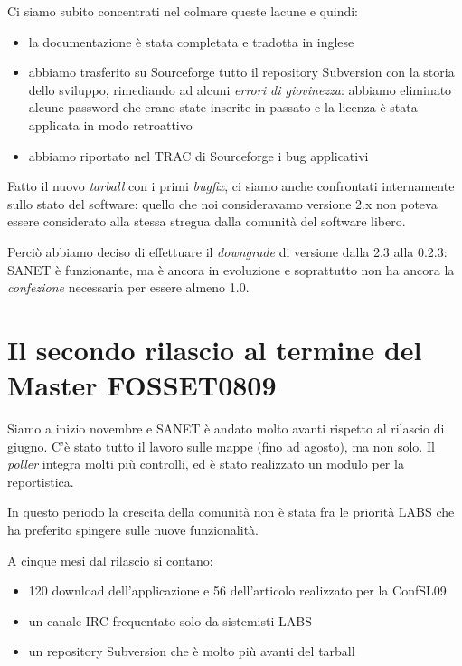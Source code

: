 \documentclass[a4wide,10pt,italian]{manual}
\begin{document}
Ci siamo subito concentrati nel colmare queste lacune e quindi:
\begin{itemize}
\item {} 
la documentazione è stata completata e tradotta in inglese

\item {} 
abbiamo trasferito su Sourceforge tutto il repository Subversion con la storia dello sviluppo,
rimediando ad alcuni \emph{errori di giovinezza}: abbiamo eliminato alcune password che erano state
inserite in passato e la licenza è stata applicata in modo retroattivo

\item {} 
abbiamo riportato nel TRAC di Sourceforge i bug applicativi

\end{itemize}

Fatto il nuovo \emph{tarball} con i primi \emph{bugfix}, ci siamo anche confrontati internamente
sullo stato del software: quello che noi consideravamo versione 2.x
non poteva essere considerato alla stessa stregua dalla comunità del software libero.

Perciò abbiamo deciso di effettuare il \emph{downgrade} di versione dalla 2.3 alla 0.2.3:
SANET è funzionante, ma è ancora in evoluzione e soprattutto non ha ancora la \emph{confezione}
necessaria per essere almeno 1.0.


\section{Il secondo rilascio al termine del Master FOSSET0809}

Siamo a inizio novembre e SANET è andato molto avanti rispetto al rilascio di giugno.
C'è stato tutto il lavoro sulle mappe (fino ad agosto), ma non solo. Il \emph{poller} integra molti più controlli,
ed è stato realizzato un modulo per la reportistica.

In questo periodo la crescita della comunità non è stata fra le priorità LABS
che ha preferito spingere sulle nuove funzionalità.

A cinque mesi dal rilascio si contano:
\begin{itemize}
\item {} 
120 download dell'applicazione e 56 dell'articolo realizzato per la ConfSL09

\item {} 
un canale IRC frequentato solo da sistemisti LABS

\item {} 
un repository Subversion che è molto più avanti del tarball

\end{itemize}
\end{document}
